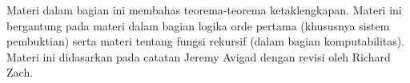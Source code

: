 \documentclass[../../include/open-logic-part]{subfiles}
\begin{document}

\begin{editorial}
 Materi dalam bagian ini membahas teorema-teorema ketaklengkapan. Materi
 ini bergantung pada materi dalam bagian logika orde pertama (khususnya
 sistem pembuktian) serta materi tentang fungsi rekursif (dalam bagian
 komputabilitas). Materi ini didasarkan pada catatan Jeremy Avigad dengan
 revisi oleh Richard Zach.
\end{editorial}






\OLEndPartHook
\end{document}
